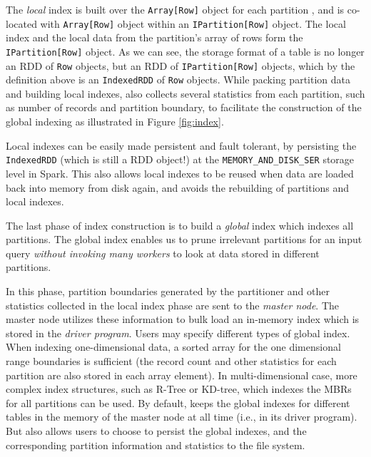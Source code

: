 The \emph{local} index is built over the \texttt{Array[Row]} object
for each partition , and is co-located with \texttt{Array[Row]} object
within an \texttt{IPartition[Row]} object. The local index and the
local data from the partition's array of rows form the
\texttt{IPartition[Row]} object. As we can see, the storage format of
a table is no longer an RDD of \texttt{Row} objects, but an RDD of
\texttt{IPartition[Row]} objects, which by the definition above is an
\texttt{IndexedRDD} of \texttt{Row} objects. While packing partition
data and building local indexes, \name also collects several
statistics from each partition, such as number of records and
partition boundary, to facilitate the construction of the global
indexing as illustrated in Figure \ref{fig:index}.

Local indexes can be easily made persistent and fault tolerant, by
persisting the \texttt{IndexedRDD} (which is still a RDD object!) at
the \texttt{MEMORY\_AND\_DISK\_SER} storage level in Spark. This also
allows local indexes to be reused when data are loaded back into
memory from disk again, and avoids the rebuilding of partitions and
local indexes.


 The last phase of index construction is to
build a \emph{global} index which indexes all partitions. The global
index enables us to prune irrelevant partitions for an input query
{\em without invoking many workers} to look at data stored in
different partitions.

In this phase, partition boundaries generated by the partitioner and
other statistics collected in the local index phase are sent to the
{\em master node}. The master node utilizes these information to bulk
load an in-memory index which is stored in the {\em driver
  program}. Users may specify different types of global index. When
indexing one-dimensional data, a sorted array for the one dimensional
range boundaries is sufficient (the record count and other statistics
for each partition are also stored in each array element). In
multi-dimensional case, more complex index structures, such as R-Tree
\cite{rtree,DBLP:conf/sigmod/BeckmannKSS90} or KD-tree, which indexes
the MBRs for all partitions can be used. By default, \name keeps the
global indexes for different tables in the memory of the master node
at all time (i.e., in its driver program). But \name also allows users
to choose to persist the global indexes, and the corresponding
partition information and statistics to the file system.

